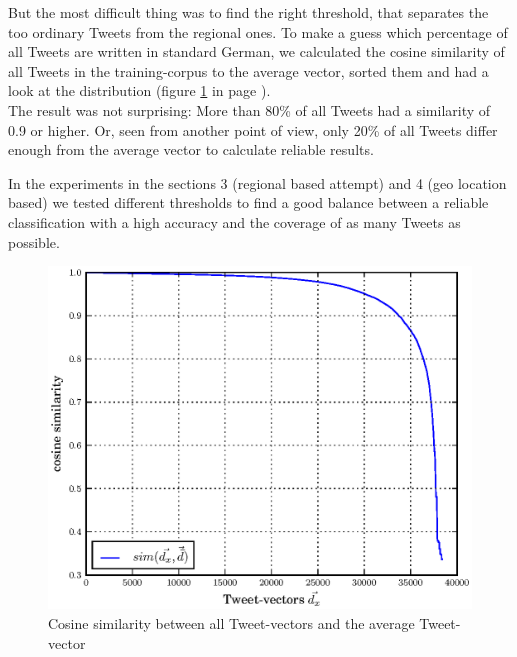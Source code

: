 \documentclass[../Main.tex]{subfiles}
\begin{document}
But the most difficult thing was to find the right threshold, that separates the too ordinary Tweets from the regional ones. To make a guess which percentage of all Tweets are written in standard German, we calculated the cosine similarity of all Tweets in the training-corpus to the average vector, sorted them and had a look at the distribution (figure \ref{cos_distribution} in page \pageref{cos_distribution}). \\
The result was not surprising: More than 80\% of all Tweets had a similarity of 0.9 or higher. Or, seen from another point of view, only 20\% of all Tweets differ enough from the average vector to calculate reliable results. 

In the experiments in the sections 3 (regional based attempt) and 4 (geo location based) we tested different thresholds to find a good balance between a reliable classification with a high accuracy and the coverage of as many Tweets as possible.

\begin{figure}
  \begin{center}
   \includegraphics[width=\columnwidth]{../img/cos-verteilung.eps}
    \caption{\label{cos_distribution} Cosine similarity between all Tweet-vectors and the average Tweet-vector}
  \end{center}
\end{figure}

\end{document}
